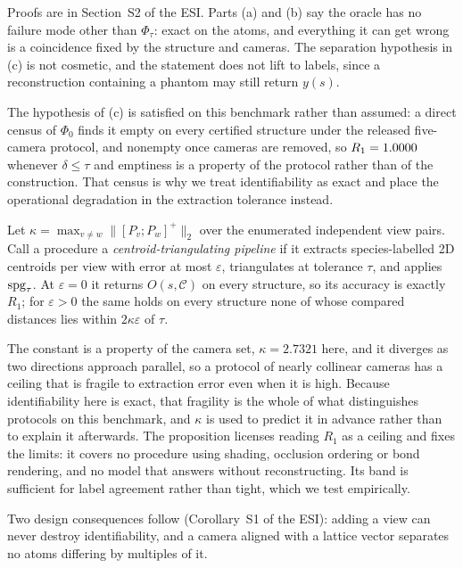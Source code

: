 Proofs are in Section~S2 of the ESI\dag{}. Parts (a) and (b) say the oracle has no failure mode other than
$\Phi_\tau$: exact on the atoms, and everything it can get wrong is a coincidence fixed by the structure and
cameras. The separation hypothesis in (c) is not cosmetic, and the statement does not lift to labels, since a
reconstruction containing a phantom may still return $y(s)$.

The hypothesis of (c) is satisfied on this benchmark rather than assumed: a direct census of $\Phi_0$ finds
it empty on every certified structure under the released five-camera protocol, and nonempty once cameras are
removed, so $R_1 = 1.0000$ whenever $\delta \le \tau$ and emptiness is a property of the protocol rather
than of the construction. That census is why we treat identifiability as exact and place the operational
degradation in the extraction tolerance instead.

\begin{proposition}
\label{prop:scope}
Let $\kappa = \max_{v \neq w} \|[P_v; P_w]^{+}\|_2$ over the enumerated independent view pairs. Call a
procedure a \emph{centroid-triangulating pipeline} if it extracts species-labelled 2D centroids per view
with error at most $\varepsilon$, triangulates at tolerance $\tau$, and applies $\mathrm{spg}_\tau$. At
$\varepsilon = 0$ it returns $O(s,\mathcal{C})$ on every structure, so its accuracy is exactly $R_1$; for
$\varepsilon > 0$ the same holds on every structure none of whose compared distances lies within
$2\kappa\varepsilon$ of $\tau$.
\end{proposition}

The constant is a property of the camera set, $\kappa = 2.7321$ here, and it diverges as two directions
approach parallel, so a protocol of nearly collinear cameras has a ceiling that is fragile to extraction error
even when it is high. Because identifiability here is exact, that fragility is the whole of what distinguishes
protocols on this benchmark, and $\kappa$ is used to
predict it in advance rather than to explain it afterwards. The proposition licenses reading $R_1$ as a
ceiling and fixes the limits: it covers no procedure using shading, occlusion ordering or bond rendering, and
no model that answers without reconstructing. Its band is sufficient for label agreement rather than tight,
which we test empirically.

Two design consequences follow (Corollary~S1 of the ESI\dag{}): adding a view can never destroy identifiability,
and a camera aligned with a lattice vector separates no atoms differing by multiples of it.

